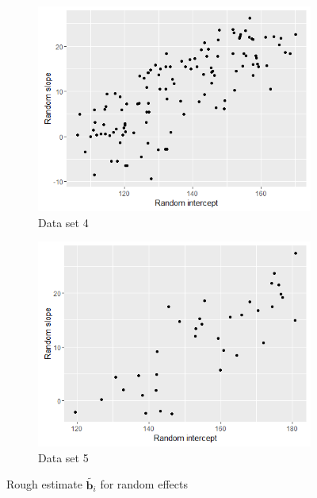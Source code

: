 \begin{figure}[!htb]
\centering
\begin{subfigure}[b]{0.4\textwidth}
		\includegraphics[width=\textwidth]{mainmatter/chapter_5_simulation_study/ds_3fused10ppg_randplot.png}
        \caption{\label{fig : ds_3fused10ppg_randplot}Data set 4}
	\end{subfigure}
	\begin{subfigure}[b]{0.4\textwidth}
		\includegraphics[width=\textwidth]{mainmatter/chapter_5_simulation_study/ds_3fused3ppg_randplot.png}
       \caption{\label{fig : ds_3fused3ppg_randplot}Data set 5}
	\end{subfigure}    
    
\caption{\label{fig : ds_3fused10ppg_3fused3ppg}Rough estimate $\tilde{\boldsymbol{b}_i}$ for random effects}
\end{figure}

